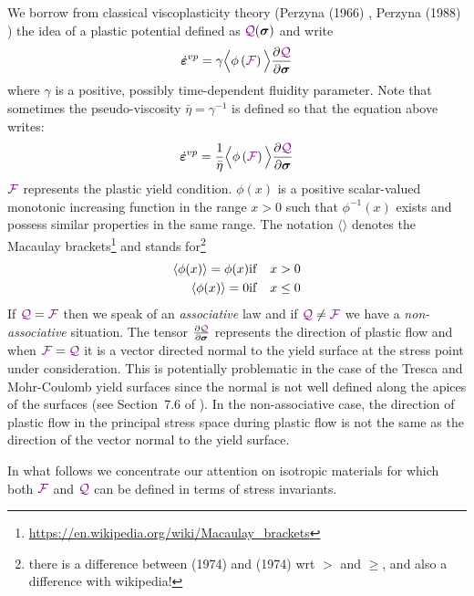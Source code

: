 We borrow from classical viscoplasticity theory (Perzyna (1966) \cite{perz66}, Perzyna (1988) \cite{perz88}) 
the idea of a plastic potential defined as ${\color{violet}\cal Q}({\bm \sigma})$ and write
\begin{equation}
{\dot{\bm \varepsilon}}^{vp} 
= \gamma \Big\langle
\phi\left( {{\color{violet}\cal F}} \right) 
\Big\rangle
\frac{\partial {\color{violet}\cal Q}}{\partial \bm\sigma}
\end{equation}
where $\gamma$ is a positive, possibly time-dependent fluidity parameter. 
Note that sometimes the pseudo-viscosity $\bar{\eta}=\gamma^{-1}$ is defined \cite{zigo74}
so that the equation above writes:
\begin{equation}
{\dot{\bm \varepsilon}}^{vp} 
= \frac{1}{\bar{\eta}} \Big\langle
\phi\left( {{\color{violet}\cal F}} \right) 
\Big\rangle
\frac{\partial {\color{violet}\cal Q}}{\partial \bm\sigma}
\end{equation}
${{\color{violet}\cal F}}$ represents the plastic yield condition.
$\phi(x)$ is a positive scalar-valued monotonic increasing function in the range 
$x>0$ such that $\phi^{-1}(x)$ exists and possess similar properties in the same range. 
The notation $\langle \rangle$ denotes the Macaulay 
brackets\footnote{\url{https://en.wikipedia.org/wiki/Macaulay_brackets}} and stands 
for\footnote{there is a difference between 
\cite{zico74}(1974) and \cite{zico74b}(1974) wrt $>$ and $\ge$, and also 
a difference with wikipedia!} 
\begin{eqnarray}
\langle \phi(x) \rangle = \phi(x) & {\rm if} & x>0 \nonumber\\
\langle \phi(x) \rangle = 0 & {\rm if} & x\le 0 \nonumber
\end{eqnarray}
If ${{\color{violet}\cal Q}}={{\color{violet}\cal F}}$ then we speak of an {\it associative} law and if ${{\color{violet}\cal Q}} \neq {{\color{violet}\cal F}}$ 
we have a {\it non-associative} situation. 
The tensor $\frac{\partial {\color{violet}\cal Q}}{\partial \bm\sigma}$ represents the direction
of plastic flow and when ${{\color{violet}\cal F}}={{\color{violet}\cal Q}}$ it is a vector directed normal to the yield surface
at the stress point under consideration. This is potentially problematic in the 
case of the Tresca and Mohr-Coulomb yield surfaces since the normal is not well defined
along the apices of the surfaces (see Section~7.6 of \cite{owhi}).
In the non-associative case, the direction of plastic flow in the 
principal  stress space during plastic flow is not the same
as the direction of the vector normal to the yield surface.

In what follows we concentrate our attention on isotropic materials for which 
both ${{\color{violet}\cal F}}$ and ${{\color{violet}\cal Q}}$ can be defined in terms of stress invariants.


